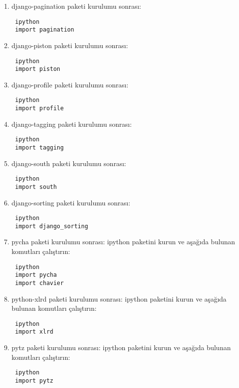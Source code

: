 \documentclass[a4paper,10pt]{article}
\begin{document}
\begin{enumerate}
\item django-pagination paketi kurulumu sonrası:

\begin{verbatim}
 ipython
 import pagination
\end{verbatim}

\item django-piston paketi kurulumu sonrası:

\begin{verbatim}
 ipython
 import piston
\end{verbatim}

\item django-profile paketi kurulumu sonrası:

\begin{verbatim}
 ipython
 import profile
\end{verbatim}

\item django-tagging paketi kurulumu sonrası:
\begin{verbatim}
 ipython
 import tagging
\end{verbatim}

\item django-south paketi kurulumu sonrası:
\begin{verbatim}
 ipython
 import south
\end{verbatim}

\item django-sorting paketi kurulumu sonrası:

\begin{verbatim}
 ipython
 import django_sorting
\end{verbatim}

\item pycha paketi kurulumu sonrası:
ipython paketini kurun ve aşağıda bulunan komutları çalıştırın:
\begin{verbatim}
 ipython
 import pycha
 import chavier
\end{verbatim}

\item python-xlrd paketi kurulumu sonrası:
ipython paketini kurun ve aşağıda bulunan komutları çalıştırın:
\begin{verbatim}
 ipython
 import xlrd
\end{verbatim}

\item pytz paketi kurulumu sonrası:
ipython paketini kurun ve aşağıda bulunan komutları çalıştırın:
\begin{verbatim}
 ipython
 import pytz
\end{verbatim}


\end{enumerate}
\end{document}
